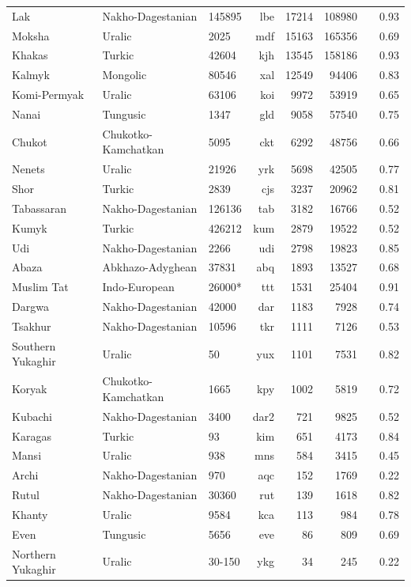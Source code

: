 {\begin{tabular}{|p{4cm}|l|p{1.3cm}|r|r|r|r|r|}
Lak  & Nakho-Dagestanian  & 145895 &  lbe & 17214  & 108980  &  & 0.93 \\
Moksha & Uralic   &  2025 &   mdf & 15163  & 165356  &  & 0.69 \\
Khakas  & Turkic  & 42604 &  kjh & 13545  & 158186  &  & 0.93 \\
Kalmyk  & Mongolic  & 	80546 &  xal & 12549  & 94406   &  & 0.83 \\
Komi-Permyak & Uralic  & 	63106 &  koi & 9972   & 53919   &  & 0.65 \\
Nanai  & Tungusic  & 1347 &  gld & 9058   & 57540   &  & 0.75 \\
Chukot  & Chukotko-Kamchatkan  & 5095 &  ckt & 6292   & 48756   &  & 0.66 \\
Nenets & Uralic   & 21926 &  yrk & 5698   & 42505   &  & 0.77 \\
Shor & Turkic   & 2839 &  cjs & 3237   & 20962   &  & 0.81 \\
Tabassaran & Nakho-Dagestanian    & 	126136 &  tab & 3182   & 16766   &  & 0.52 \\
Kumyk  & Turkic  & 	426212 &   kum & 2879   & 19522   &  & 0.52 \\
Udi  & Nakho-Dagestanian  & 2266 &  udi & 2798   & 19823   &  & 0.85 \\
Abaza & Abkhazo-Adyghean   &  37831   &   abq & 1893   & 13527   &  & 0.68 \\
Muslim Tat & Indo-European   & 26000* &  ttt & 1531   & 25404   &  & 0.91 \\
Dargwa & Nakho-Dagestanian   & 	42000 &  dar & 1183   & 7928    &  & 0.74 \\
Tsakhur & Nakho-Dagestanian   & 	10596 &  tkr & 1111   & 7126    &  & 0.53 \\
Southern Yukaghir  & Uralic  & 50 &  yux & 1101   & 7531    &  & 0.82 \\
Koryak & Chukotko-Kamchatkan   & 1665 &  kpy & 1002   & 5819    &  & 0.72 \\
Kubachi & Nakho-Dagestanian   & 3400 & dar2 & 721    & 9825    &  & 0.52 \\
Karagas  & Turkic  & 	93 &  kim & 651    & 4173    &  & 0.84 \\
Mansi & Uralic   & 938 &  mns & 584    & 3415    &  & 0.45 \\
Archi & Nakho-Dagestanian    & 970 &   aqc & 152    & 1769    &  & 0.22 \\
Rutul & Nakho-Dagestanian    & 30360 &  rut & 139    & 1618    &  & 0.82 \\
Khanty & Uralic   &  9584 &  kca & 113    & 984     &  & 0.78 \\
Even  & Tungusic  & 	5656 &  eve & 86     & 809     &  & 0.69 \\
Northern Yukaghir  & Uralic  & 30-150 &  ykg & 34     & 245     &  & 0.22 \\
\hline
\end{tabular}}

